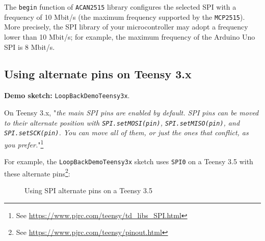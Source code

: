 \documentclass[10pt, a4paper, obeyspaces]{extarticle}
\newcommand \subsectionLabel[2]{\subsection{#1}\label{subsec:#2}}
\newcommand\labelFigure[1]{\label{fig:#1}}
\begin{document}
The \texttt{begin} function of \texttt{ACAN2515} library configures the selected SPI with a frequency of 10 Mbit/s (the maximum frequency supported by the \texttt{MCP2515}). More precisely, the SPI library of your microcontroller may adopt a frequency lower than 10 Mbit/s; for example, the maximum frequency of the Arduino Uno SPI is 8 Mbit/s.




\subsectionLabel{Using alternate pins on Teensy 3.x}{TeensyAlternatePins}

{\bf Demo sketch: } \texttt{LoopBackDemoTeensy3x}.

On Teensy 3.x, "\emph{the main SPI pins are enabled by default. SPI pins can be moved to their alternate position with \texttt{SPI.setMOSI(pin)}, \texttt{SPI.setMISO(pin)}, and \texttt{SPI.setSCK(pin)}. You can move all of them, or just the ones that conflict, as you prefer.}"\footnote{See \url{https://www.pjrc.com/teensy/td_libs_SPI.html}}

For example, the \texttt{LoopBackDemoTeensy3x} sketch uses \texttt{SPI0} on a Teensy 3.5 with these alternate pins\footnote{See \url{https://www.pjrc.com/teensy/pinout.html}}:
\begin{figure}[!ht]
  \small
  \centering
  \caption{Using SPI alternate pins on a Teensy 3.5}
  \labelFigure{figureHardwareSPIAlternatePins}
\end{figure}
\end{document}
